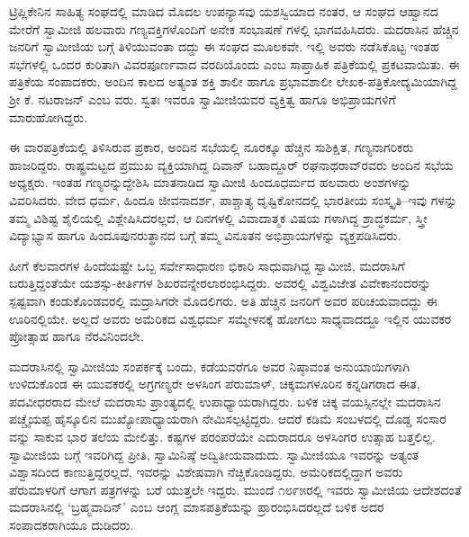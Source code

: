 ಟ್ರಿಪ್ಲಿಕೇನಿನ ಸಾಹಿತ್ಯ ಸಂಘದಲ್ಲಿ ಮಾಡಿದ ಮೊದಲ ಉಪನ್ಯಾಸವು ಯಶಸ್ವಿಯಾದ ನಂತರ, ಆ ಸಂಘದ ಆಹ್ವಾನದ ಮೇರೆಗೆ ಸ್ವಾಮೀಜಿ ಹಲವಾರು ಗಣ್ಯವಕ್ತಿಗಳೊಂದಿಗೆ ಅನೇಕ ಸಂಭಾಷಣೆ ಗಳಲ್ಲಿ ಭಾಗವಹಿಸಿದರು. ಮದರಾಸಿನ ಹೆಚ್ಚಿನ ಜನರಿಗೆ ಸ್ವಾಮೀಜಿಯ ಬಗ್ಗೆ ತಿಳಿಯುವಂತಾ ದದ್ದು ಈ ಸಂಘದ ಮೂಲಕವೇ. ಇಲ್ಲಿ ಅವರು ನಡೆಸಿಕೊಟ್ಟ ಇಂತಹ ಸಭೆಗಳಲ್ಲಿ ಒಂದರ ಕುರಿತಾಗಿ ವಿವರಪೂರ್ಣವಾದ ವರದಿಯೊಂದು  ಎಂಬ ಸಾಪ್ತಾಹಿಕ ಪತ್ರಿಕೆಯಲ್ಲಿ ಪ್ರಕಟವಾಯಿತು. ಈ ಪತ್ರಿಕೆಯ ಸಂಪಾದಕರು, ಅಂದಿನ ಕಾಲದ ಅತ್ಯಂತ ಶಕ್ತಿ ಶಾಲೀ ಹಾಗೂ ಪ್ರಭಾವಶಾಲೀ ಲೇಖಕ-ಪತ್ರಿಕೋದ್ಯಮಿಯಾಗಿದ್ದ ಶ್ರೀ ಕೆ. ನಟರಾಜನ್ ಎಂಬ ವರು. ಸ್ವತಃ ಇವರೂ ಸ್ವಾಮೀಜಿಯವರ ವ್ಯಕ್ತಿತ್ವ ಹಾಗೂ ಅಭಿಪ್ರಾಯಗಳಿಗೆ ಮಾರುಹೋಗಿದ್ದರು.

ಈ ವಾರಪತ್ರಿಕೆಯಲ್ಲಿ ತಿಳಿಸಿರುವ ಪ್ರಕಾರ, ಅಂದಿನ ಸಭೆಯಲ್ಲಿ ನೂರಕ್ಕೂ ಹೆಚ್ಚಿನ ಸುಶಿಕ್ಷಿತ, ಗಣ್ಯನಾಗರಿಕರು ಹಾಜರಿದ್ದರು. ರಾಷ್ಟ್ರಮಟ್ಟದ ಪ್ರಮುಖ ವ್ಯಕ್ತಿಯಾಗಿದ್ದ ದಿವಾನ್ ಬಹಾದ್ದೂರ್ ರಘನಾಥರಾವ್​ರವರು ಅಂದಿನ ಸಭೆಯ ಅಧ್ಯಕ್ಷರು. ಇಂತಹ ಗಣ್ಯರನ್ನುದ್ದೇಶಿಸಿ ಮಾತನಾಡಿದ ಸ್ವಾಮೀಜಿ ಹಿಂದೂಧರ್ಮದ ಹಲವಾರು ಅಂಶಗಳನ್ನು ವಿವರಿಸಿದರು. ವೇದ ಧರ್ಮ, ಹಿಂದೂ ಜೀವನಾದರ್ಶ, ಪಾಶ್ಚಾತ್ಯ ದೃಷ್ಟಿಕೋನದಲ್ಲಿ ಭಾರತೀಯ ಸಂಸ್ಕೃತಿ–ಇವು ಗಳನ್ನು ತಮ್ಮ ವಿಶಿಷ್ಟ ಶೈಲಿಯಲ್ಲಿ ವಿಶ್ಲೇಷಿಸಿದರಲ್ಲದೆ, ಆ ದಿನಗಳಲ್ಲಿ ವಿವಾದಾತ್ಮಕ ವಿಷಯ ಗಳಾಗಿದ್ದ ಶ್ರಾದ್ಧಕರ್ಮ, ಸ್ತ್ರೀ ವಿದ್ಯಾಭ್ಯಾಸ ಹಾಗೂ ಹಿಂದೂಪುನರುತ್ಥಾನದ ಬಗ್ಗೆ ತಮ್ಮ ವಿನೂತನ ಅಭಿಪ್ರಾಯಗಳನ್ನು ವ್ಯಕ್ತಪಡಿಸಿದರು.

ಹೀಗೆ ಕೆಲವಾರಗಳ ಹಿಂದೆಯಷ್ಟೇ ಒಬ್ಬ ಸರ್ವೇಸಾಧಾರಣ ಭಿಕಾರಿ ಸಾಧುವಾಗಿದ್ದ ಸ್ವಾಮೀಜಿ, ಮದರಾಸಿಗೆ ಬರುತ್ತಿದ್ದಂತೆಯೇ ಯಶಸ್ಸು-ಕೀರ್ತಿಗಳ ಶಿಖರವನ್ನೇರಲಾರಂಭಿಸಿದ್ದರು. ಅವರಲ್ಲಿ ವಿಶ್ವವಿಜೇತ ವಿವೇಕಾನಂದರನ್ನು ಸ್ಪಷ್ಟವಾಗಿ ಕಂಡುಕೊಂಡವರಲ್ಲಿ ಮದ್ರಾಸಿಗರೇ ಮೊದಲಿಗರು. ಅತಿ ಹೆಚ್ಚಿನ ಜನರಿಗೆ ಅವರ ಪರಿಚಯವಾದದ್ದು ಈ ಊರಿನಲ್ಲಿಯೇ. ಅಲ್ಲದೆ ಅವರು ಅಮೆರಿಕದ ವಿಶ್ವಧರ್ಮ ಸಮ್ಮೇಳನಕ್ಕೆ ಹೋಗಲು ಸಾಧ್ಯವಾದದ್ದೂ ಇಲ್ಲಿನ ಯುವಕರ ಪ್ರೋತ್ಸಾಹ ಹಾಗೂ ನೆರವಿನಿಂದಲೇ.

ಮದರಾಸಿನಲ್ಲಿ ಸ್ವಾಮೀಜಿಯ ಸಂಪರ್ಕಕ್ಕೆ ಬಂದು, ಕಡೆಯವರೆಗೂ ಅವರ ನಿಷ್ಠಾವಂತ ಅನುಯಾಯಿಗಳಾಗಿ ಉಳಿದುಕೊಂಡ ಈ ಯುವಕರಲ್ಲಿ ಅಗ್ರಗಣ್ಯರೇ ಅಳಸಿಂಗ ಪೆರುಮಾಳ್, ಚಿಕ್ಕಮಗಳೂರಿನ ಕನ್ನಡಿಗರಾದ ಈತ, ಪದವೀಧರರಾದ ಮೇಲೆ ಮದರಾಸು ಪ್ರಾಂತ್ಯದಲ್ಲಿ ಉಪಾಧ್ಯಾಯರಾಗಿದ್ದರು. ಬಳಿಕ ಚಿಕ್ಕ ವಯಸ್ಸಿನಲ್ಲೇ ಮದರಾಸಿನ ಪಚ್ಚೈಯಪ್ಪ ಹೈಸ್ಕೂಲಿನ ಮುಖ್ಯೋಪಾಧ್ಯಾಯರಾಗಿ ನೇಮಿಸಲ್ಪಟ್ಟಿದ್ದರು. ಆದರೆ ಕಡಿಮೆ ಸಂಬಳದಲ್ಲಿ ದೊಡ್ಡ ಸಂಸಾರ ವನ್ನು ಸಾಕುವ ಭಾರ ತಲೆಯ ಮೇಲಿತ್ತು. ಕಷ್ಟಗಳ ಪರಂಪರೆಯೇ ಎದುರಾದರೂ ಅಳಸಿಂಗರ ಉತ್ಸಾಹ ಬತ್ತಲಿಲ್ಲ. ಸ್ವಾಮೀಜಿಯ ಬಗ್ಗೆ ಇವರಿಗಿದ್ದ ಪ್ರೀತಿ, ಸ್ವಾಮಿನಿಷ್ಠೆ ಅದ್ವಿತೀಯವಾದುದು. ಸ್ವಾಮೀಜಿಯೂ ಇವರನ್ನು ಅತ್ಯಂತ ವಿಶ್ವಾಸದಿಂದ ಕಾಣುತ್ತಿದ್ದರಲ್ಲದೆ, ಇವರನ್ನು ವಿಶೇಷವಾಗಿ ನೆಚ್ಚಿಕೊಂಡಿದ್ದರು. ಅಮೆರಿಕದಲ್ಲಿದ್ದಾಗ ಅವರು ಪೆರುಮಾಳರಿಗೆ ಆಗಾಗ ಪತ್ರಗಳನ್ನು ಬರೆ ಯುತ್ತಲೇ ಇದ್ದರು. ಮುಂದೆ ೧೮೯೫ರಲ್ಲಿ ಇವರು ಸ್ವಾಮೀಜಿಯ ಆದೇಶದಂತೆ ಮದರಾಸಿನಲ್ಲಿ ‘ಬ್ರಹ್ಮವಾದಿನ್​’ ಎಂಬ ಆಂಗ್ಲ ಮಾಸಪತ್ರಿಕೆಯನ್ನು ಪ್ರಾರಂಭಿಸಿದರಲ್ಲದೆ ಬಳಿಕ ಅದರ ಸಂಪಾದಕರಾಗಿಯೂ ದುಡಿದರು.

